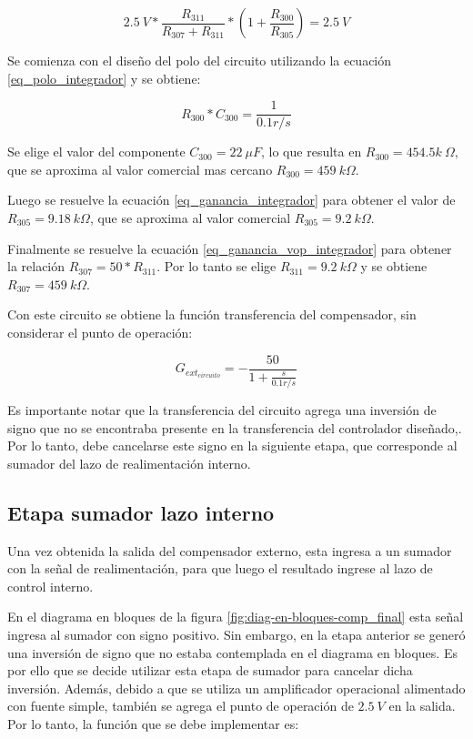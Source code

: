 \begin{equation} \label{eq_ganancia_vop_integrador}
	2.5\:V*\frac{R_{311}}{R_{307}+R_{311}}*(1+\frac{R_{300}}{R_{305}})=2.5\:V
\end{equation}

Se comienza con el diseño del polo del circuito utilizando la ecuación \ref{eq_polo_integrador} y se obtiene:

\begin{equation}
	R_{300}*C_{300}=\frac{1}{0.1r/s}
\end{equation}

Se elige el valor del componente $C_{300}=22\:\mu F$, lo que resulta en $R_{300}=454.5k\:\Omega$, que se aproxima al valor comercial mas cercano $R_{300}=459\:k\Omega$.

Luego se resuelve la ecuación \ref{eq_ganancia_integrador} para obtener el valor de $R_{305}=9.18\:k\Omega$, que se aproxima al valor comercial $R_{305}=9.2\:k\Omega$.

Finalmente se resuelve la ecuación \ref{eq_ganancia_vop_integrador} para obtener la relación $R_{307}=50*R_{311}$. Por lo tanto se elige $R_{311}=9.2\:k\Omega$ y se obtiene $R_{307}=459\:k\Omega$.


Con este circuito se obtiene la función transferencia del compensador, sin considerar el punto de operación:

\begin{equation} \label{eq_gexterno_circuito}
	G_{ext_{circuito}}=-\frac{50}{1+\frac{s}{0.1r/s}}
\end{equation}

Es importante notar que la transferencia del circuito agrega una inversión de signo que no se encontraba presente en la transferencia del controlador diseñado,. Por lo tanto, debe cancelarse este signo en la siguiente etapa, que corresponde al sumador del lazo de realimentación interno.


\subsection{Etapa sumador lazo interno}

Una vez obtenida la salida del compensador externo, esta ingresa a un sumador con la señal de realimentación, para que luego el resultado ingrese al lazo de control interno.

En el diagrama en bloques de la figura \ref{fig:diag-en-bloques-comp_final} esta señal ingresa al sumador con signo positivo. Sin embargo, en la etapa anterior se generó una inversión de signo que no estaba contemplada en el diagrama en bloques. Es por ello que se decide utilizar esta etapa de sumador para cancelar dicha inversión. Además, debido a que se utiliza un amplificador operacional alimentado con fuente simple, también se agrega el punto de operación de $2.5\:V$ en la salida. Por lo tanto, la función que se debe implementar es:

